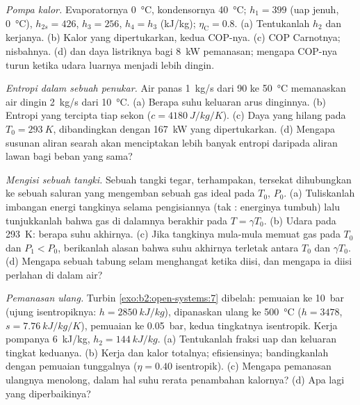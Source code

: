 \begin{exercise}[$\star\star$]\label{exo:b2:open-systems:8}
\emph{Pompa kalor.} Evaporatornya \qty{0}{\celsius}, kondensornya \qty{40}{\celsius};
$h_1 = 399$ (uap jenuh, \qty{0}{\celsius}), $h_{2s} = 426$, $h_3 = 256$,
$h_4 = h_3$ (\unit{kJ/kg}); $\eta_{\text{C}} = 0.8$. (a) Tentukanlah $h_2$ dan kerjanya.
(b) Kalor yang dipertukarkan, kedua COP-nya. (c) COP Carnotnya; nisbahnya. (d) 
dan daya listriknya bagi \qty{8}{kW} pemanasan; mengapa COP-nya turun ketika
udara luarnya menjadi lebih dingin.
\end{exercise}

\begin{exercise}[$\star\star$]\label{exo:b2:open-systems:9}
\emph{Entropi dalam sebuah penukar.} Air panas \qty{1}{kg/s} dari \qty{90}{} ke
\qty{50}{\celsius} memanaskan air dingin \qty{2}{kg/s} dari \qty{10}{\celsius}.
(a) Berapa suhu keluaran arus dinginnya. (b) Entropi yang tercipta tiap
sekon ($c = \qty{4180}{J/kg/K}$). (c) Daya yang hilang pada $T_0 = \qty{293}{K}$,
dibandingkan dengan \qty{167}{kW} yang dipertukarkan. (d) Mengapa susunan aliran
searah akan menciptakan lebih banyak entropi daripada aliran lawan bagi beban yang sama?
\end{exercise}

\begin{exercise}[$\star\star\star$]\label{exo:b2:open-systems:10}
\emph{Mengisi sebuah tangki.} Sebuah tangki tegar, terhampakan, tersekat dihubungkan
ke sebuah saluran yang mengemban sebuah gas ideal pada $T_0$, $P_0$. (a) Tuliskanlah imbangan
energi tangkinya selama pengisiannya (tak : energinya tumbuh) lalu
tunjukkanlah bahwa gas di dalamnya berakhir pada $T = \gamma T_0$. (b) Udara pada \qty{293}{K}:
berapa suhu akhirnya. (c) Jika tangkinya mula-mula memuat gas pada $T_0$ dan
$P_1 < P_0$, berikanlah alasan bahwa suhu akhirnya terletak antara $T_0$ dan
$\gamma T_0$. (d) Mengapa sebuah tabung selam menghangat ketika diisi, dan mengapa
ia diisi perlahan di dalam air?
\end{exercise}

\begin{exercise}[$\star\star\star$]\label{exo:b2:open-systems:11}
\emph{Pemanasan ulang.} Turbin \cref{exo:b2:open-systems:7} dibelah:
pemuaian ke \qty{10}{bar} (ujung isentropiknya: $h = \qty{2850}{kJ/kg}$), dipanaskan ulang
ke \qty{500}{\celsius} ($h = 3478$, $s = \qty{7.76}{kJ/kg/K}$), pemuaian ke
\qty{0.05}{bar}, kedua tingkatnya isentropik. Kerja pompanya \qty{6}{kJ/kg}, $h_2 =
\qty{144}{kJ/kg}$. (a) Tentukanlah fraksi uap dan  keluaran tingkat keduanya. (b)
Kerja dan kalor totalnya; efisiensinya; bandingkanlah dengan pemuaian tunggalnya
($\eta = 0.40$ isentropik). (c) Mengapa pemanasan ulangnya menolong, dalam hal suhu
rerata penambahan kalornya? (d) Apa lagi yang diperbaikinya?
\end{exercise}

